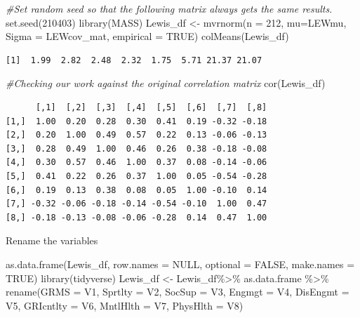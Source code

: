 \documentclass[
]{book}
\newenvironment{Shaded}{\begin{snugshade}}{\end{snugshade}}
\newcommand{\AttributeTok}[1]{\textcolor[rgb]{0.77,0.63,0.00}{#1}}
\newcommand{\CommentTok}[1]{\textcolor[rgb]{0.56,0.35,0.01}{\textit{#1}}}
\newcommand{\ConstantTok}[1]{\textcolor[rgb]{0.00,0.00,0.00}{#1}}
\newcommand{\DecValTok}[1]{\textcolor[rgb]{0.00,0.00,0.81}{#1}}
\newcommand{\FunctionTok}[1]{\textcolor[rgb]{0.00,0.00,0.00}{#1}}
\newcommand{\NormalTok}[1]{#1}
\newcommand{\OtherTok}[1]{\textcolor[rgb]{0.56,0.35,0.01}{#1}}
\newcommand{\SpecialCharTok}[1]{\textcolor[rgb]{0.00,0.00,0.00}{#1}}
\begin{document}
\begin{Shaded}
\begin{Highlighting}[]
\CommentTok{\#Set random seed so that the following matrix always gets the same results.}
\FunctionTok{set.seed}\NormalTok{(}\DecValTok{210403}\NormalTok{)}
\FunctionTok{library}\NormalTok{(MASS)}
\NormalTok{Lewis\_df }\OtherTok{\textless{}{-}} \FunctionTok{mvrnorm}\NormalTok{(}\AttributeTok{n =} \DecValTok{212}\NormalTok{, }\AttributeTok{mu=}\NormalTok{LEWmu, }\AttributeTok{Sigma =}\NormalTok{ LEWcov\_mat, }\AttributeTok{empirical =} \ConstantTok{TRUE}\NormalTok{)}
\FunctionTok{colMeans}\NormalTok{(Lewis\_df)}
\end{Highlighting}
\end{Shaded}

\begin{verbatim}
[1]  1.99  2.82  2.48  2.32  1.75  5.71 21.37 21.07
\end{verbatim}

\begin{Shaded}
\begin{Highlighting}[]
\CommentTok{\#Checking our work against the original correlation matrix}
\FunctionTok{cor}\NormalTok{(Lewis\_df)}
\end{Highlighting}
\end{Shaded}

\begin{verbatim}
      [,1]  [,2]  [,3]  [,4]  [,5]  [,6]  [,7]  [,8]
[1,]  1.00  0.20  0.28  0.30  0.41  0.19 -0.32 -0.18
[2,]  0.20  1.00  0.49  0.57  0.22  0.13 -0.06 -0.13
[3,]  0.28  0.49  1.00  0.46  0.26  0.38 -0.18 -0.08
[4,]  0.30  0.57  0.46  1.00  0.37  0.08 -0.14 -0.06
[5,]  0.41  0.22  0.26  0.37  1.00  0.05 -0.54 -0.28
[6,]  0.19  0.13  0.38  0.08  0.05  1.00 -0.10  0.14
[7,] -0.32 -0.06 -0.18 -0.14 -0.54 -0.10  1.00  0.47
[8,] -0.18 -0.13 -0.08 -0.06 -0.28  0.14  0.47  1.00
\end{verbatim}

Rename the variables

\begin{Shaded}
\begin{Highlighting}[]
\FunctionTok{as.data.frame}\NormalTok{(Lewis\_df, }\AttributeTok{row.names =} \ConstantTok{NULL}\NormalTok{, }\AttributeTok{optional =} \ConstantTok{FALSE}\NormalTok{, }\AttributeTok{make.names =} \ConstantTok{TRUE}\NormalTok{)}
\FunctionTok{library}\NormalTok{(tidyverse)}
\NormalTok{Lewis\_df }\OtherTok{\textless{}{-}}\NormalTok{ Lewis\_df}\SpecialCharTok{\%\textgreater{}\%}
\NormalTok{  as.data.frame }\SpecialCharTok{\%\textgreater{}\%}
  \FunctionTok{rename}\NormalTok{(}\AttributeTok{GRMS =}\NormalTok{ V1, }\AttributeTok{Sprtlty =}\NormalTok{ V2, }\AttributeTok{SocSup =}\NormalTok{ V3, }\AttributeTok{Engmgt =}\NormalTok{ V4, }\AttributeTok{DisEngmt =}\NormalTok{ V5, }\AttributeTok{GRIcntlty =}\NormalTok{ V6, }\AttributeTok{MntlHlth =}\NormalTok{ V7, }\AttributeTok{PhysHlth =}\NormalTok{ V8)}
\end{Highlighting}
\end{Shaded}
\end{document}
